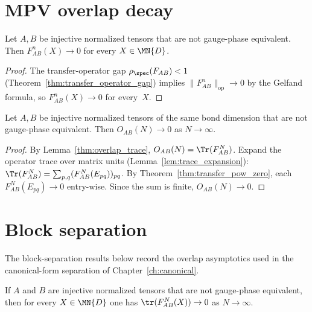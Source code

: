 \section{MPV overlap decay}

\begin{theorem}\label{thm:transfer_pow_zero}
    \leanok
    Let $A, B$ be injective normalized tensors that are not
    gauge-phase equivalent.
    Then $F_{AB}^n(X) \to 0$ for every $X \in \MN{D}$.
\end{theorem}

\begin{proof}
    \leanok
    The transfer-operator gap $\rho_{\spec}(F_{AB}) < 1$
    (Theorem~\ref{thm:transfer_operator_gap})
    implies $\|F_{AB}^n\|_{\mathrm{op}} \to 0$
    by the Gelfand formula,
    so $F_{AB}^n(X) \to 0$ for every~$X$.
\end{proof}

\begin{theorem}\label{thm:overlap_decay}
    \leanok
    Let $A, B$ be injective normalized tensors of the same bond
    dimension that are not gauge-phase equivalent.
    Then $O_{AB}(N) \to 0$ as $N \to \infty$.
\end{theorem}

\begin{proof}
    \leanok
    By Lemma~\ref{thm:overlap_trace},
    $O_{AB}(N) = \Tr(F_{AB}^N)$.
    Expand the operator trace over matrix units
    (Lemma~\ref{lem:trace_expansion}):
    $\Tr(F_{AB}^N) = \sum_{p,q} (F_{AB}^N(E_{pq}))_{pq}$.
    By Theorem~\ref{thm:transfer_pow_zero},
    each $F_{AB}^N(E_{pq}) \to 0$ entry-wise.
    Since the sum is finite, $O_{AB}(N) \to 0$.
\end{proof}

\section{Block separation}

The block-separation results below record the overlap asymptotics used in the
canonical-form separation of Chapter~\ref{ch:canonical}.

\begin{theorem}\label{thm:cross_decay}
    \leanok
    If $A$ and $B$ are injective normalized tensors that are not
    gauge-phase equivalent, then for every $X \in \MN{D}$ one has
    $\tr(F_{AB}^N(X)) \to 0$ as $N \to \infty$.
\end{theorem}

